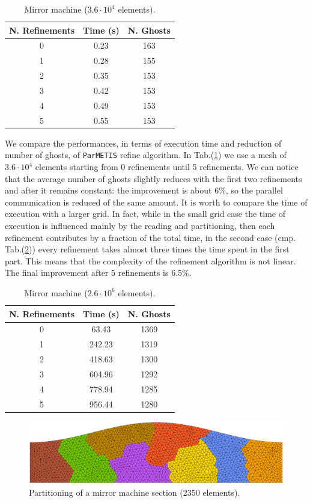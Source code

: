 \begin{table}
\centering
\begin{tabular}{|c|c|c|}
\hline
 N. Refinements & Time (s) & N. Ghosts\\
\hline
 0 & 0.23 & 163\\
\hline
 1 &  0.28 & 155\\
\hline
 2 & 0.35 & 153\\
\hline
 3 & 0.42 & 153\\
\hline
 4 & 0.49 & 153\\
\hline
 5 & 0.55 & 153\\
\hline
\end{tabular}
\caption{Mirror machine ($3.6\cdot 10^{4}$ elements).}
\label{tab:mirror_36k}
\end{table}

We compare the performances, in terms of execution time and reduction of number of ghosts, of \verb|ParMETIS| refine algorithm. In Tab.(\ref{tab:mirror_36k}) we use a mesh of $3.6\cdot 10^{4}$ elements starting from 0 refinements until 5 refinements. We can notice that the average number of ghosts slightly reduces with the first two refinements and after it remains constant: the improvement is about 6\%, so the parallel communication is reduced of the same amount. It is worth to compare the time of execution with a larger grid. In fact, while in the small grid case the time of execution is influenced mainly by the reading and partitioning, then each refinement contributes by a fraction of the total time, in the second case (cmp. Tab.(\ref{tab:mirror_26M})) every refinement takes almost three times the time spent in the first part. This means that the complexity of the refinement algorithm is not linear. The final improvement after 5 refinements is 6.5\%.

\begin{table}
\centering
\begin{tabular}{|c|c|c|}
\hline
 N. Refinements & Time (s) & N. Ghosts\\
\hline
 0 & 63.43 & 1369\\
\hline
 1 &  242.23 & 1319\\
\hline
 2 & 418.63 & 1300\\
\hline
 3 & 604.96 & 1292\\
\hline
 4 & 778.94 & 1285\\
\hline
 5 & 956.44 & 1280\\
\hline
\end{tabular}
\caption{Mirror machine ($2.6\cdot 10^{6}$ elements).}
\label{tab:mirror_26M}
\end{table}

\begin{figure}
\centering
\includegraphics[scale=.27]{images/mirror_partitioned.eps}
\caption{Partitioning of a mirror machine section (2350 elements).}
\label{fig:mirror}
\end{figure}
